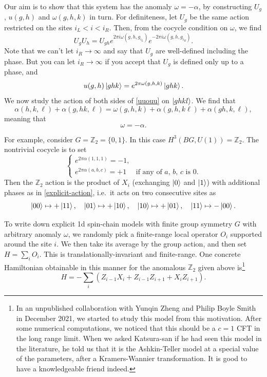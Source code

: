 \documentclass[12pt]{article}
\numberwithin{equation}{section}
\numberwithin{figure}{section}
\theoremstyle{remark}
\def\bZ{\mathbb{Z}}
\begin{document}
Our aim is to show that this system has the anomaly $\omega=-\alpha$,
by constructing $U_g$, $u(g,h)$ and $\omega(g,h,k)$ in turn.
For definiteness, let $U_g$ be the same action restricted on the sites $i_L < i < i_R$.
Then, from the cocycle condition on $\omega$, we find \begin{equation}
U_g U_h = U_{gh} e^{2\pi i \omega(g,h,g_{i_L} )} e^{-2\pi i \omega(g,h,g_{i_R} )}.
\end{equation} 
Note that we can't let $i_R\to \infty$ and say that $U_g$ are well-defined including the phase.
But you can let $i_R\to \infty$ if you accept that $U_g$ is defined only up to a phase,
and  \begin{equation}
u(g,h) \ket{ghk} = e^{2\pi \omega(g,h,k)} \ket{ghk}.
\end{equation}
We now study the action of both sides of \eqref{uuouu} on $\ket{ghkl}$.
We find that \begin{equation}
\alpha(h,k,\ell) +\alpha(g,hk,\ell) = \omega(g,h,k) + \alpha(g,h,k\ell)
+ \alpha(gh,k,\ell), 
\end{equation} meaning that \begin{equation}
\omega=-\alpha.
\end{equation}


For example, consider $G=\bZ_2=\{0,1\}$. In this case $H^3(BG,U(1))=\bZ_2$.
The nontrivial cocycle is to set
\begin{equation}
\begin{cases}
e^{2\pi \alpha(1,1,1)}=-1, & \\
e^{2\pi \alpha(a,b,c)}=+1 & \text{if any of $a$, $b$, $c$ is 0}.
\end{cases}
\end{equation}
Then the $\bZ_2$ action is the product of $X_i$ (exchanging $\ket0$ and $\ket1$)
with additional phases as in \eqref{explicit-action}, i.e.~it acts on two consecutive sites as \begin{equation}
\ket{00} \mapsto +\ket{11}, \quad
\ket{01} \mapsto +\ket{10}, \quad
\ket{10} \mapsto +\ket{01}, \quad
\ket{11} \mapsto -\ket{00}.
\end{equation}

To write down explicit 1d spin-chain models
with finite group symmetry $G$ with arbitrary anomaly $\omega$,
we randomly pick a finite-range local operator $O_i$ supported around the site $i$.
We then take its average by the group action,
and then set $H=\sum_i O_i$.
This  is translationally-invariant and finite-range.
One concrete Hamiltonian obtainable in this manner for the anomalous $\bZ_2$ given above 
is\footnote{%
In an unpublished collaboration with Yunqin Zheng and Philip Boyle Smith in December 2021,
we started to study this model from this motivation.
After some numerical computations, we noticed that this should be a $c=1$ CFT in the long range limit.
When we asked Katsura-san if he had seen this model in the literature,
he told us that it is the Ashkin-Teller model at a special value of the parameters,
after a Kramers-Wannier transformation.
It is good to have a knowledgeable friend indeed.
} \begin{equation}
H=-\sum_i (Z_{i-1} X_i + Z_{i-1} Z_{i+1} + X_i Z_{i+1} ).
\end{equation} 
\end{document}
